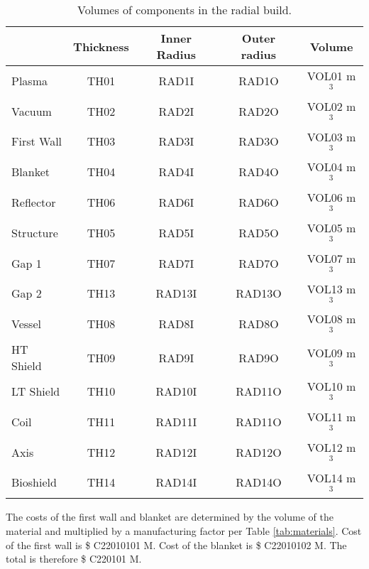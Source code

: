 \begin{table}[h!]
    \centering
    \begin{tabular}{l c  c c c}
        \hline
        &	Thickness	&	Inner Radius	&	Outer radius	&	Volume		\\
        \hline
        Plasma	&	TH01	&	RAD1I	&	RAD1O	&	VOL01	m$^{3}$	\\
        Vacuum	&	TH02	&	RAD2I	&	RAD2O	&	VOL02	m$^{3}$	\\
        First Wall	&	TH03	&	RAD3I	&	RAD3O	&	VOL03	m$^{3}$	\\
        Blanket	&	TH04	&	RAD4I	&	RAD4O	&	VOL04	m$^{3}$	\\
        Reflector	&	TH06	&	RAD6I	&	RAD6O	&	VOL06	m$^{3}$	\\
        Structure	&	TH05	&	RAD5I	&	RAD5O	&	VOL05	m$^{3}$	\\
        Gap	1 &	TH07	&	RAD7I	&	RAD7O	&	VOL07	m$^{3}$	\\
        Gap 2	&	TH13	&	RAD13I	&	RAD13O	&	VOL13	m$^{3}$	\\
        Vessel	&	TH08	&	RAD8I	&	RAD8O	&	VOL08	m$^{3}$	\\
        HT Shield	&	TH09	&	RAD9I	&	RAD9O	&	VOL09	m$^{3}$	\\
        LT Shield	&	TH10	&	RAD10I	&	RAD11O	&	VOL10	m$^{3}$	\\
        Coil	&	TH11	&	RAD11I	&	RAD11O	&	VOL11	m$^{3}$	\\
        Axis	&	TH12	&	RAD12I	&	RAD12O	&	VOL12	m$^{3}$	\\
        Bioshield	&	TH14	&	RAD14I	&	RAD14O	&	VOL14	m$^{3}$	\\
        \hline
    \end{tabular}
    \caption{Volumes of components in the radial build.}
    \label{tab:volumes}
\end{table}




The costs of the first wall and blanket are determined by the volume of the material and multiplied by a manufacturing factor per Table \ref{tab:materials}.   Cost of the first wall is \$ C22010101 M.  Cost of the blanket is \$ C22010102 M. The total is therefore \$ C220101 M.

